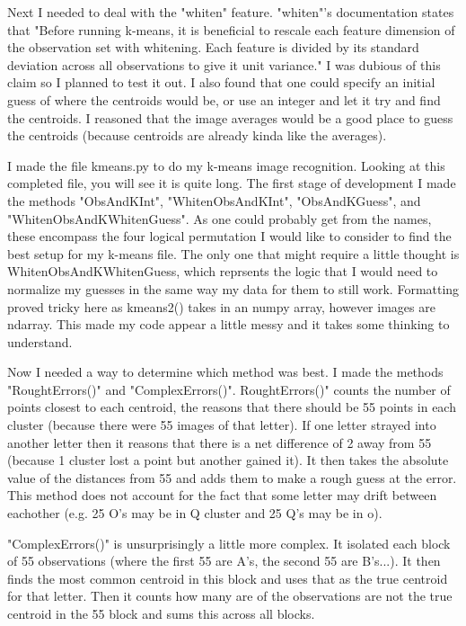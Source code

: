 \documentclass[a4paper]{article}
\begin{document}
Next I needed to deal with the "whiten" feature. "whiten"'s documentation states that "Before running k-means, it is beneficial to rescale each feature dimension of the observation set with whitening. Each feature is divided by its standard deviation across all observations to give it unit variance." I was dubious of this claim so I planned to test it out. I also found that one could specify an initial guess of where the centroids would be, or use an integer and let it try and find the centroids. I reasoned that the image averages would be a good place to guess the centroids (because centroids are already kinda like the averages).

I made the file k\textunderscore means.py to do my k-means image recognition. Looking at this completed file, you will see it is quite long. The first stage of development I made the methods "ObsAndKInt", "WhitenObsAndKInt", "ObsAndKGuess", and "WhitenObsAndKWhitenGuess". As one could probably get from the names, these encompass the four logical permutation I would like to consider to find the best setup for my k-means file. The only one that might require a little thought is  WhitenObsAndKWhitenGuess, which reprsents the logic that I would need to normalize my guesses in the same way my data for them to still work. Formatting proved tricky here as kmeans2() takes in an numpy array, however images are ndarray. This made my code appear a little messy and it takes some thinking to understand. 

Now I needed a way to determine which method was best. I made the methods "RoughtErrors()" and "ComplexErrors()". RoughtErrors()" counts the number of points closest to each centroid, the reasons that there should be 55 points in each cluster (because there were 55 images of that letter). If one letter strayed into another letter then it reasons that there is a net difference of 2 away from 55 (because 1 cluster lost a point but another gained it). It then takes the absolute value of the distances from 55 and adds them to make a rough guess at the error. This method does not account for the fact that some letter may drift between eachother (e.g. 25 O's may be in Q cluster and 25 Q's may be in o).

"ComplexErrors()" is unsurprisingly a little more complex. It isolated each block of 55 observations (where the first 55 are A's, the second 55 are B's...). It then finds the most common centroid in this block and uses that as the true centroid for that letter. Then it counts how many are of the observations are not the true centroid in the 55 block and sums this across all blocks.
\end{document}
